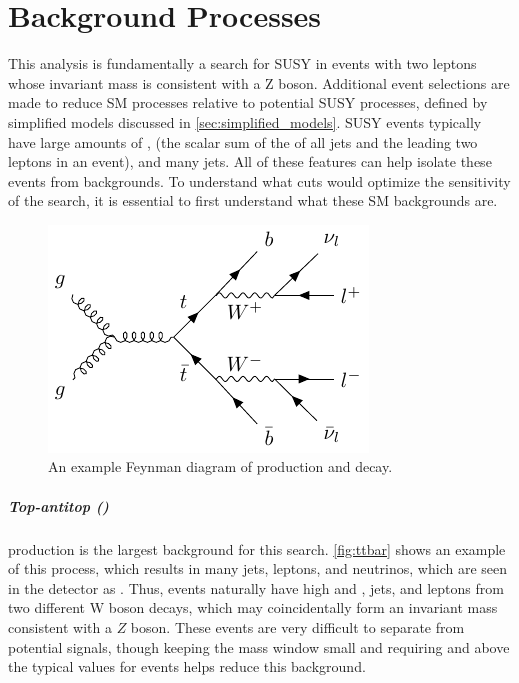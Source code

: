 
\chapter{Background Processes} %

\label{ch:background_processes} 


This analysis is fundamentally a search for \acf{SUSY} in events with two leptons whose invariant mass is consistent with a Z boson. Additional event selections are made to reduce \acf{SM} processes relative to potential \ac{SUSY} processes, defined by simplified models discussed in \autoref{sec:simplified_models}. \ac{SUSY} events typically have large amounts of \MET, \HT (the scalar sum of the \pT of all jets and the leading two leptons in an event), and many jets. All of these features can help isolate these events from backgrounds. To understand what cuts would optimize the sensitivity of the search, it is essential to first understand what these \ac{SM} backgrounds are. 

\begin{centering}
\begin{figure}[bth]
\myfloatalign
\includegraphics[width=.70\linewidth]{feynman/ttbar.pdf}
\caption{An example Feynman diagram of \ttbar production and decay.}
\label{fig:ttbar}
\end{figure}
\end{centering}

\paragraph{Top-antitop (\ttbar)} production is the largest background for this search. \autoref{fig:ttbar} shows an example of this process, which results in many jets, leptons, and neutrinos, which are seen in the detector as \MET. Thus, \ttbar events naturally have high \MET and \HT, jets, and leptons from two different W boson decays, which may coincidentally form an invariant mass consistent with a $Z$ boson. These events are very difficult to separate from potential signals, though keeping the mass window small and requiring \MET and \HT above the typical values for \ttbar events helps reduce this background.

